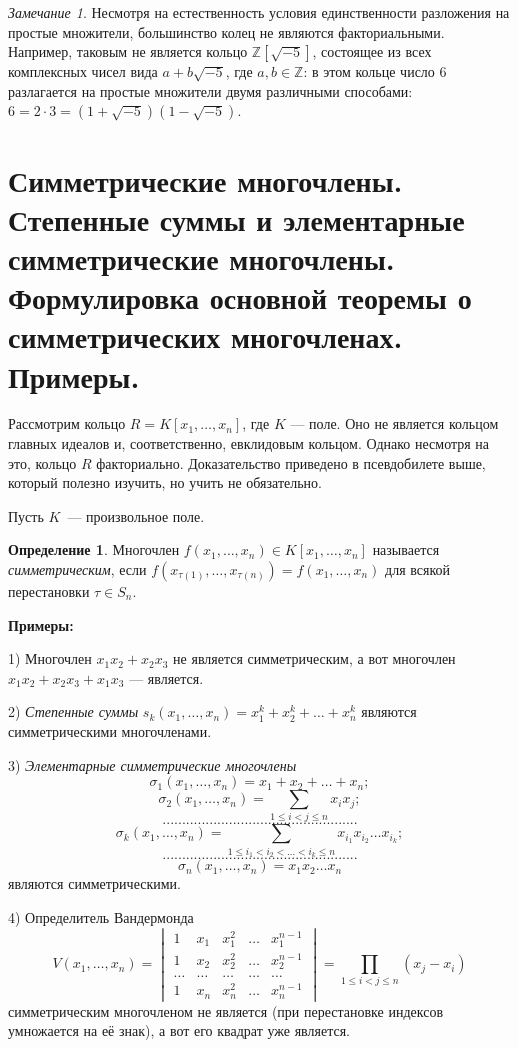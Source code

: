 \documentclass[a4paper, 12pt]{article}
\def\ZZ{{\mathbb Z}}%
\theoremstyle{definition}
\newtheorem{definition}{Определение}
\theoremstyle{remark}
\newtheorem{remark}{Замечание}
\begin{document}
\begin{remark}
Несмотря на естественность условия единственности разложения на
простые множители, большинство колец не являются факториальными.
Например, таковым не является кольцо $\ZZ[\sqrt{-5}]$, состоящее из
всех комплексных чисел вида $a + b \sqrt{-5}$, где $a,b \in \ZZ$: в
этом кольце число $6$ разлагается на простые множители двумя
различными способами: $6 = 2 \cdot 3 = (1 + \sqrt{-5})(1 -
\sqrt{-5})$.
\end{remark}


\section{Симметрические многочлены. Степенные суммы и элементарные симметрические многочлены. Формулировка основной теоремы о симметрических многочленах. Примеры.}

Рассмотрим кольцо $R = K[x_1, \ldots, x_n]$, где $K$ --- поле. 
Оно не является кольцом главных идеалов и, соответственно, евклидовым кольцом. Однако несмотря на это, кольцо $R$ факториально. Доказательство приведено в псевдобилете выше, который полезно изучить, но учить не обязательно.

Пусть $K$~--- произвольное поле.

\begin{definition}
Многочлен $f(x_1,\ldots,x_n)\in K[x_1,\ldots,x_n]$ называется {\it
симметрическим}, если
$f(x_{\tau(1)},\ldots,x_{\tau(n)})=f(x_1,\ldots,x_n)$ для всякой
перестановки $\tau \in S_n$.
\end{definition}

\textbf{Примеры:}

1) Многочлен $x_1x_2 + x_2x_3$ не является симметрическим, а вот многочлен $x_1x_2 + x_2x_3 + x_1x_3$ --- является.

2) {\it Степенные суммы} $s_k(x_1, \ldots, x_n) = x_1^k + x_2^k +
\ldots + x_n^k$ являются симметрическими многочленами.

3) {\it Элементарные симметрические многочлены}
$$
\sigma_1(x_1, \ldots, x_n) = x_1 + x_2 + \ldots + x_n;
$$
$$
\sigma_2(x_1, \ldots, x_n) = \sum \limits_{1 \leqslant i < j
\leqslant n} x_i x_j;
$$
$$
..................................................
$$
$$
\sigma_k(x_1, \ldots, x_n) = \sum \limits_{1 \leqslant i_1 < i_2 <
\ldots < i_k \leqslant n} x_{i_1} x_{i_2} \ldots x_{i_k};
$$
$$
..................................................
$$
$$
\sigma_n(x_1, \ldots, x_n) = x_1 x_2 \ldots x_n
$$
являются симметрическими.

4) Определитель Вандермонда
$$
V(x_1, \ldots, x_n) =
\begin{vmatrix}
1 & x_1 & x_1^2 & \ldots & x_1^{n-1} \\
1 & x_2 & x_2^2 & \ldots & x_2^{n-1} \\
\ldots & \ldots & \ldots & \ldots & \ldots \\
1 & x_n & x_n^2 & \ldots & x_n^{n-1}
\end{vmatrix} =
\prod \limits_{1 \leqslant i < j \leqslant n} (x_j - x_i)
$$
симметрическим многочленом не является (при перестановке индексов
умножается на её знак), а вот его квадрат уже является.
\end{document}
